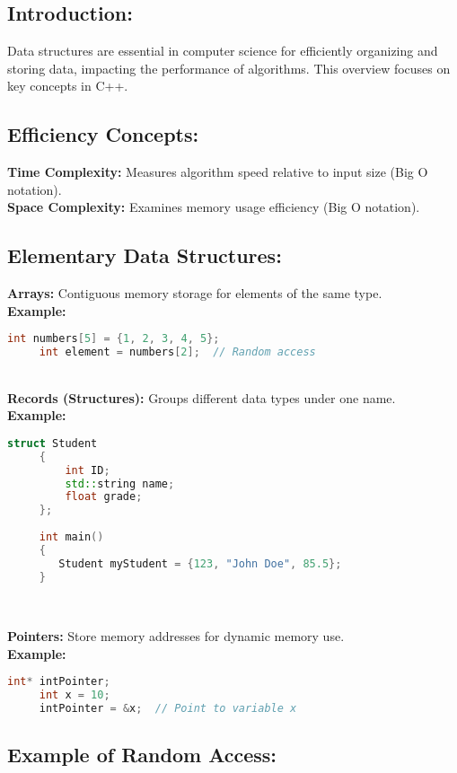 \documentclass[12pt, a4paper]{report}
\begin{document}
\subsection*{Introduction:}
Data structures are essential in computer science for efficiently organizing and storing data, impacting the performance of algorithms. This overview focuses on key concepts in C++.

\subsection*{Efficiency Concepts:}
\textbf{Time Complexity:} Measures algorithm speed relative to input size (Big O notation).
\textbf{\\Space Complexity:} Examines memory usage efficiency (Big O notation).

\subsection*{Elementary Data Structures:}

\textbf{Arrays:} Contiguous memory storage for elements of the same type.
\\
\textbf{Example:}

\begin{lstlisting}[language=C++]
     int numbers[5] = {1, 2, 3, 4, 5};
     int element = numbers[2];  // Random access
\end{lstlisting}
\textbf{\\Records (Structures):} Groups different data types under one name.
\\
\textbf{Example:}
\begin{lstlisting}[language=C++]
     struct Student 
     {
         int ID;
         std::string name;
         float grade;
     };
     
     int main()
     {
        Student myStudent = {123, "John Doe", 85.5};
     }
     
\end{lstlisting}
\textbf{\\Pointers:} Store memory addresses for dynamic memory use.
\textbf{\\Example:}

\begin{lstlisting}[language=C++]
     int* intPointer;
     int x = 10;
     intPointer = &x;  // Point to variable x
\end{lstlisting}

\subsection*{Example of Random Access:}
\end{document}
